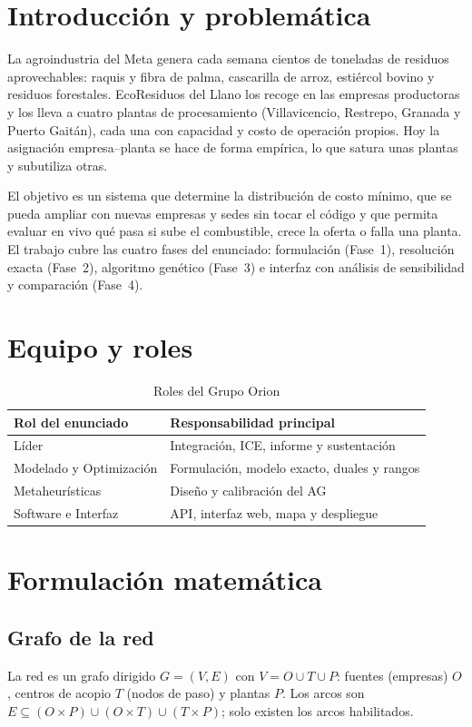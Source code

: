 \documentclass[conference]{IEEEtran}
\begin{document}
\section{Introducción y problemática}
La agroindustria del Meta genera cada semana cientos de toneladas de residuos aprovechables: raquis y
fibra de palma, cascarilla de arroz, estiércol bovino y residuos forestales. EcoResiduos del Llano los
recoge en las empresas productoras y los lleva a cuatro plantas de procesamiento (Villavicencio,
Restrepo, Granada y Puerto Gaitán), cada una con capacidad y costo de operación propios. Hoy la
asignación empresa–planta se hace de forma empírica, lo que satura unas plantas y subutiliza otras.

El objetivo es un sistema que determine la distribución de costo mínimo, que se pueda ampliar con
nuevas empresas y sedes sin tocar el código y que permita evaluar en vivo qué pasa si sube el
combustible, crece la oferta o falla una planta. El trabajo cubre las cuatro fases del enunciado:
formulación (Fase~1), resolución exacta (Fase~2), algoritmo genético (Fase~3) e interfaz con análisis
de sensibilidad y comparación (Fase~4).

\section{Equipo y roles}
\begin{table}[h]
\centering
\caption{Roles del Grupo Orion}
\begin{tabular}{@{}ll@{}}
\toprule
Rol del enunciado & Responsabilidad principal \\
\midrule
Líder & Integración, ICE, informe y sustentación \\
Modelado y Optimización & Formulación, modelo exacto, duales y rangos \\
Metaheurísticas & Diseño y calibración del AG \\
Software e Interfaz & API, interfaz web, mapa y despliegue \\
\bottomrule
\end{tabular}
\end{table}

\section{Formulación matemática}
\subsection{Grafo de la red}
La red es un grafo dirigido $G=(V,E)$ con $V = O \cup T \cup P$: fuentes (empresas) $O$, centros de
acopio $T$ (nodos de paso) y plantas $P$. Los arcos son
$E \subseteq (O\times P) \cup (O\times T) \cup (T\times P)$; solo existen los arcos habilitados.
\end{document}
